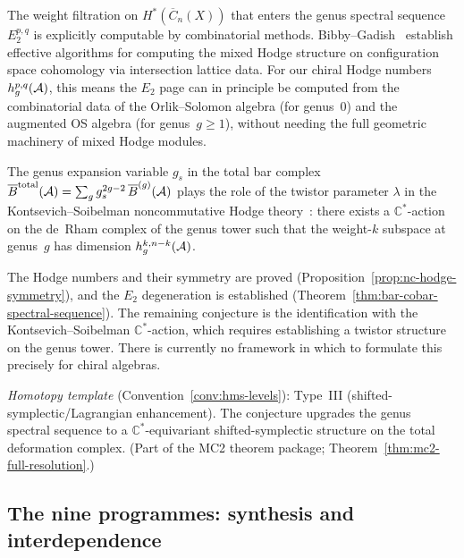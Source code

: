 \begin{remark}\label{rem:weight-filtration-computable}
The weight filtration on $H^*(\overline{C}_n(X))$ that enters the genus spectral sequence $E_2^{p,q}$ is explicitly computable by combinatorial methods.  Bibby--Gadish~\cite{BG24} establish effective algorithms for computing the mixed Hodge structure on configuration space cohomology via intersection lattice data.  For our chiral Hodge numbers $h^{p,q}_g(\mathcal{A})$, this means the $E_2$ page can in principle be computed from the combinatorial data of the Orlik--Solomon algebra (for genus~$0$) and the augmented OS algebra (for genus~$g \geq 1$), without needing the full geometric machinery of mixed Hodge modules.
\end{remark}

\begin{conjecture}\label{conj:nc-hodge}
The genus expansion variable $g_s$ in the total bar complex
$\overline{B}^{\mathrm{total}}(\mathcal{A}) = \sum_g g_s^{2g-2}\, \overline{B}^{(g)}(\mathcal{A})$
plays the role of the twistor parameter $\lambda$ in the
Kontsevich--Soibelman noncommutative Hodge
theory~\cite{KontsevichSoibelman}: there exists a
$\mathbb{C}^*$-action on the de~Rham complex of the genus tower
such that the weight-$k$ subspace at genus~$g$ has dimension
$h^{k,n-k}_g(\mathcal{A})$.
\end{conjecture}

\begin{remark}[Scope]\label{rem:nc-hodge-scope}
The Hodge numbers and their symmetry are proved
(Proposition~\ref{prop:nc-hodge-symmetry}), and the $E_2$
degeneration is established
(Theorem~\ref{thm:bar-cobar-spectral-sequence}).  The remaining
conjecture is the identification with the Kontsevich--Soibelman
$\mathbb{C}^*$-action, which requires establishing a twistor
structure on the genus tower.  There is currently no framework
in which to formulate this precisely for chiral algebras.

\emph{Homotopy template} (Convention~\ref{conv:hms-levels}): Type~III
(shifted-symplectic/Lagrangian enhancement).  The conjecture
upgrades the genus spectral sequence to a $\mathbb{C}^*$-equivariant
shifted-symplectic structure on the total deformation complex.
(Part of the MC2 theorem package; Theorem~\ref{thm:mc2-full-resolution}.)
\end{remark}

\subsection{The nine programmes: synthesis and interdependence}
\label{subsec:programme-synthesis}

